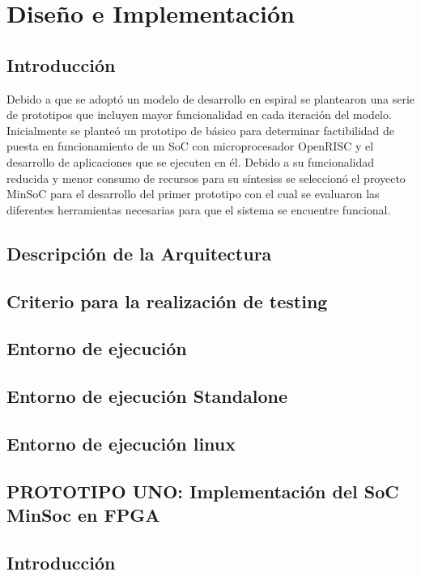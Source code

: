 \chapter{Diseño e Implementación}
	\section{Introducción}
	Debido a que se adoptó un modelo de desarrollo en espiral se plantearon una
	serie de prototipos que incluyen mayor funcionalidad en cada iteración del
	modelo. Inicialmente se planteó un prototipo de básico para determinar
	factibilidad de puesta en funcionamiento de un SoC con microprocesador
	OpenRISC y el desarrollo de aplicaciones que se ejecuten en él.
	Debido a su funcionalidad reducida y menor consumo de recursos para su
	síntesiss se seleccionó el proyecto MinSoC para el desarrollo del primer
	prototipo con el cual se evaluaron las diferentes herramientas
	necesarias para que el sistema se encuentre funcional.
	
	\section{Descripción de la Arquitectura}

	 
	\section{Criterio para la realización de testing}
	\section{Entorno de ejecución}
		\section{Entorno de ejecución Standalone}
		\section{Entorno de ejecución linux}
	
	\section{PROTOTIPO UNO: Implementación del SoC MinSoc en FPGA}
		\section{Introducción}
